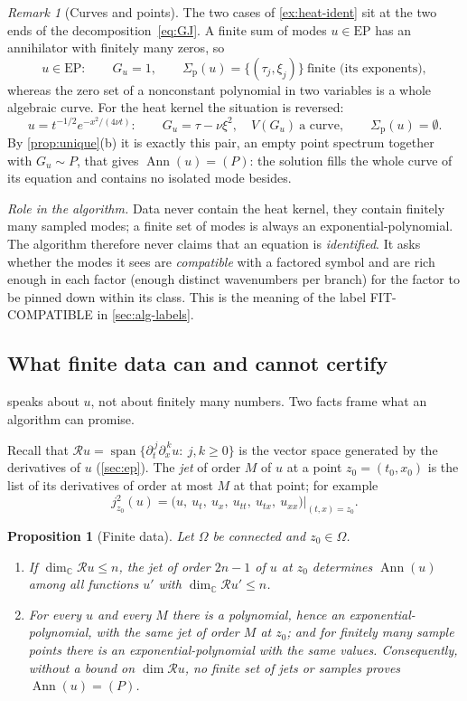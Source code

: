 \documentclass[11pt]{article}
\theoremstyle{plain}
\newtheorem{proposition}[theorem]{Proposition}
\theoremstyle{definition}
\theoremstyle{remark}
\newtheorem{remark}[theorem]{Remark}
\newcommand{\C}{\mathbb{C}}
\newcommand{\ring}{\mathcal{R}}            %
\DeclareMathOperator{\Ann}{Ann}             %
\DeclareMathOperator{\spn}{span}
\newcommand{\Var}{V}                        %
\newcommand{\EP}{\mathrm{EP}}               %
\newcommand{\Gu}{G_u}                       %
\newcommand{\sigp}{\Sigma_{\mathrm p}}      %
\newcommand{\lab}[1]{\textsf{#1}}           %
\newcommand{\FC}{\lab{FIT-COMPATIBLE}}
\newcommand{\roleinalg}[1]{\par\noindent\emph{Role in the algorithm.} #1\par}
\begin{document}
\begin{remark}[Curves and points]\label{rem:curves-points}
The two cases of \cref{ex:heat-ident} sit at the two ends of the decomposition~\eqref{eq:GJ}. A finite sum of modes
$u\in\EP$ has an annihilator with finitely many zeros, so
\[
  u\in\EP:\qquad \Gu=1,\qquad \sigp(u)=\{(\tau_j,\xi_j)\}\ \text{finite (its exponents)},
\]
whereas the zero set of a nonconstant polynomial in two variables is a whole algebraic curve. For the heat kernel
the situation is reversed:
\[
  u=t^{-1/2}e^{-x^2/(4\nu t)}:\qquad \Gu=\tau-\nu\xi^2,\quad \Var(\Gu)\ \text{a curve},\qquad \sigp(u)=\emptyset .
\]
By \cref{prop:unique}(b) it is exactly this pair, an empty point spectrum together with $\Gu\sim P$, that gives
$\Ann(u)=(P)$: the solution fills the whole curve of its equation and contains no isolated mode besides.
\end{remark}

\roleinalg{Data never contain the heat kernel, they contain finitely many sampled modes; a finite
set of modes is always an exponential-polynomial. The algorithm therefore never claims that an
equation is \emph{identified}. It asks whether the modes it sees are \emph{compatible} with a factored
symbol and are rich enough in each factor (enough distinct wavenumbers per branch) for the factor to
be pinned down within its class. This is the meaning of the label \FC{} in \cref{sec:alg-labels}.}

\subsection{What finite data can and cannot certify}\label{sec:certify}
 speaks about $u$, not about finitely many numbers. Two facts frame what an algorithm
can promise.

Recall that $\ring u=\spn\{\partial_t^{\,j}\partial_x^{\,k}u:\ j,k\ge0\}$ is the vector space generated by the
derivatives of $u$ (\cref{sec:ep}). The \emph{jet} of order $M$ of $u$ at a point $z_0=(t_0,x_0)$ is the list of its
derivatives of order at most $M$ at that point; for example
\[
  j^2_{z_0}(u)=\big(u,\ u_t,\ u_x,\ u_{tt},\ u_{tx},\ u_{xx}\big)\big|_{(t,x)=z_0}.
\]

\begin{proposition}[Finite data]\label{prop:certify}
Let $\Omega$ be connected and $z_0\in\Omega$.
\begin{enumerate}[label=(\roman*)]
  \item If $\dim_\C\ring u\le n$, the jet of order $2n-1$ of $u$ at $z_0$ determines $\Ann(u)$ among all functions
  $u'$ with $\dim_\C\ring u'\le n$.
  \item For every $u$ and every $M$ there is a polynomial, hence an exponential-polynomial, with the same jet of
  order $M$ at $z_0$; and for finitely many sample points there is an exponential-polynomial with the same values.
  Consequently, without a bound on $\dim\ring u$, no finite set of jets or samples proves $\Ann(u)=(P)$.
\end{enumerate}
\end{proposition}
\end{document}
